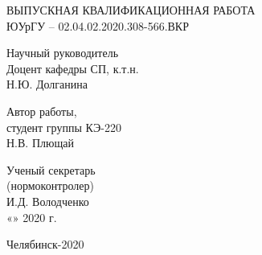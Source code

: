 \begin{titlepage}
\begin{center}
        ВЫПУСКНАЯ КВАЛИФИКАЦИОННАЯ РАБОТА\\
        ЮУрГУ – 02.04.02.2020.308-566.ВКР
    \end{center}
    \vfill

    \hfill
    \begin{minipage}{0.4\textwidth}
        Научный руководитель\\
        Доцент кафедры СП, к.т.н.\\
        \underline{\hspace{2cm}} Н.Ю. Долганина\\
    \end{minipage}
    \bigskip
    \vfill

    \hfill
    \begin{minipage}{0.4\textwidth}
        Автор работы,\\
        студент группы КЭ-220\\
        \underline{\hspace{2cm}} Н.В. Плющай\\
    \end{minipage}
    \bigskip
    \vfill

    \hfill
    \begin{minipage}{0.4\textwidth}
        Ученый секретарь\\
        (нормоконтролер)\\
        \underline{\hspace{2cm}} И.Д. Володченко\\
        «\underline{\hspace{0.7cm}}» \underline{\hspace{2cm}} 2020 г.
    \end{minipage}
    \bigskip
    \vfill

    \begin{center}
        Челябинск-2020
    \end{center}
\end{titlepage}
